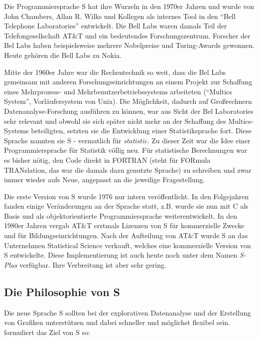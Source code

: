 \documentclass[
]{book}
\begin{document}
Die Programmiersprache S hat ihre Wurzeln in den 1970er Jahren und wurde von John Chambers,
Allan R. Wilks und Kollegen als internes Tool in den ``Bell Telephone Laboratories'' entwickelt.
Die Bell Labs waren damals Teil der Telefongesellschaft AT\&T und ein bedeutendes Forschungszentrum.
Forscher der Bel Labs haben beispielsweise mehrere Nobelpreise und Turing-Awards gewonnen.
Heute gehören die Bell Labs zu Nokia.

Mitte der 1960er Jahre war die Rechentechnik so weit, dass die Bel Labs gemeinsam mit anderen
Forschungseinrichtungen an einem Projekt zur Schaffung eines Mehrprozess- und Mehrbenutzerbetriebssystems arbeiteten (``Multics System'', Vorläufersystem von Unix).
Die Möglichkeit, dadurch auf Großrechnern Datenanalyse-Forschung ausführen zu können, war aus Sicht der Bel Laboratories sehr relevant und obwohl sie sich später nicht mehr an der Schaffung des Multics-Systems beteiligten, setzten sie die Entwicklung einer Statistiksprache fort. Diese Sprache nannten sie S - vermutlich für \emph{statistic}.
Zu dieser Zeit war die Idee einer Programmiersprache für Statistik völlig neu.
Für statistische Berechnungen war es bisher nötig, den Code direkt in FORTRAN (steht für FORmula TRANslation, das war die damals dazu genutzte Sprache) zu schreiben und zwar immer wieder aufs Neue, angepasst an die jeweilige Fragestellung.

Die erste Version von S wurde 1976 nur intern veröffentlicht. In den Folgejahren fanden einige
Veränderungen an der Sprache statt, z.B. wurde sie nun mit C als Basis und als objektorientierte
Programmiersprache weiterentwickelt. In den 1980er Jahren vergab AT\&T erstmals Lizenzen von S für
kommerzielle Zwecke und für Bildungseinrichtungen.
Nach der Aufteilung von AT\&T wurde S an das Unternehmen Statistical Science verkauft, welches eine kommerzielle Version von S entwickelte.
Diese Implementierung ist auch heute noch unter dem Namen \emph{S-Plus} verfügbar.
Ihre Verbreitung ist aber sehr gering.

\hypertarget{die-philosophie-von-s}{%
\subsection{Die Philosophie von S}\label{die-philosophie-von-s}}

Die neue Sprache S sollten bei der explorativen Datenanalyse und der Erstellung von Grafiken unterstützen
und dabei schneller und möglichst flexibel sein.
\citet{Chambers_2000} formuliert das Ziel von S so:
\end{document}
